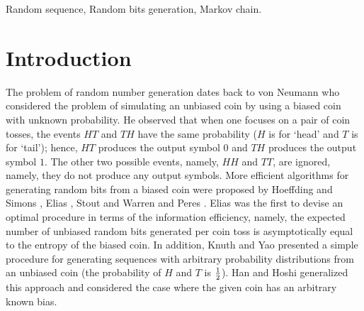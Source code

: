 \documentclass[journal]{IEEEtran}
\begin{document}
\begin{IEEEkeywords}
Random sequence, Random bits  generation, Markov chain.
\end{IEEEkeywords}

%
\IEEEpeerreviewmaketitle

\section{Introduction}

The problem of random number generation dates back to von Neumann \cite{Neumann1951} who considered the problem of simulating an unbiased coin by using a biased coin with unknown probability. He observed that when one focuses on a pair of coin tosses, the events  $HT$ and $TH$ have the same probability ($H$ is for `head' and $T$ is for `tail'); hence, $HT$ produces the output symbol $0$ and $TH$ produces the output symbol $1$. The other two possible events, namely, $HH$ and $TT$, are ignored, namely, they do not produce any output symbols. More efficient algorithms for generating random bits from a biased coin were proposed by Hoeffding and Simons \cite{Hoeffding1970}, Elias \cite{Elias1972}, Stout and Warren \cite{Warren1984} and Peres \cite{Peres1992}.  Elias \cite{Elias1972} was the first to devise an optimal procedure in terms of the information efficiency, namely, the expected number of unbiased random bits generated per coin toss is asymptotically equal to the entropy of the biased coin. In addition, Knuth and Yao \cite{Knuth1976} presented a simple procedure for generating sequences with arbitrary probability distributions from an unbiased coin (the probability of $H$ and $T$ is $1 \over 2$). Han and Hoshi \cite{Han1997} generalized this approach and considered the case where the given coin has an arbitrary known bias.
\end{document}
